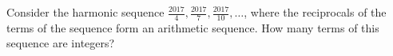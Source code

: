 Consider the harmonic sequence $\frac{2017}{4},\frac{2017}{7},\frac{2017}{10},\ldots$, where the reciprocals of the terms of the sequence form an arithmetic sequence. How many terms of this sequence are integers?